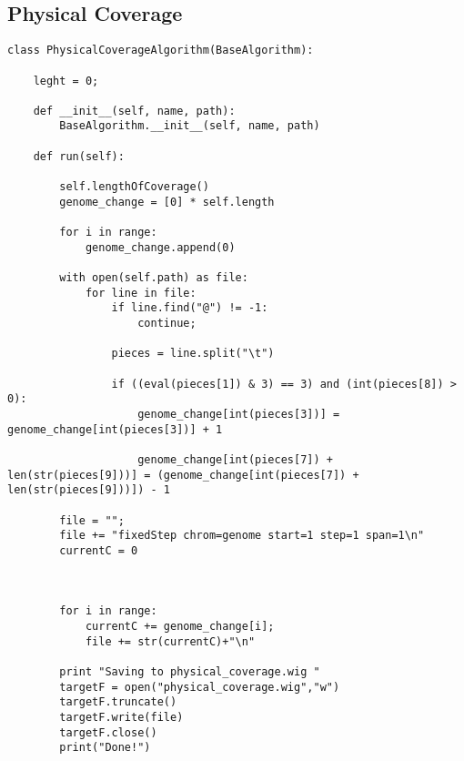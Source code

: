 \subsection{Physical Coverage}
\tiny
\begin{verbatim}
class PhysicalCoverageAlgorithm(BaseAlgorithm):

    leght = 0;

    def __init__(self, name, path):
        BaseAlgorithm.__init__(self, name, path)

    def run(self):

        self.lengthOfCoverage()
        genome_change = [0] * self.length

        for i in range:
            genome_change.append(0)

        with open(self.path) as file:
            for line in file:
                if line.find("@") != -1:
                    continue;

                pieces = line.split("\t")

                if ((eval(pieces[1]) & 3) == 3) and (int(pieces[8]) > 0):
                    genome_change[int(pieces[3])] = genome_change[int(pieces[3])] + 1

                    genome_change[int(pieces[7]) + len(str(pieces[9]))] = (genome_change[int(pieces[7]) + len(str(pieces[9]))]) - 1

        file = "";
        file += "fixedStep chrom=genome start=1 step=1 span=1\n"
        currentC = 0



        for i in range:
            currentC += genome_change[i];
            file += str(currentC)+"\n"

        print "Saving to physical_coverage.wig "
        targetF = open("physical_coverage.wig","w")
        targetF.truncate()
        targetF.write(file)
        targetF.close()
        print("Done!")
\end{verbatim}


